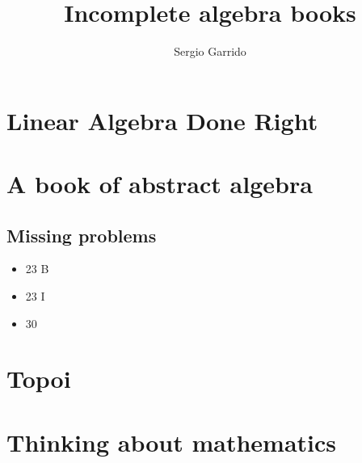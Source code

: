 \documentclass{bookSolutions}
\title{Incomplete algebra books}
\author{Sergio Garrido}
\begin{document}
\tableofcontents
\newpage

\section{Linear Algebra Done Right}













\newpage
\section{A book of abstract algebra}
\subsection{Missing problems}
\begin{itemize}
    \item 23 B
    \item 23 I
    \item 30
\end{itemize}


















\newpage
\section{Topoi}


\newpage
\section{Thinking about mathematics}

\end{document}
